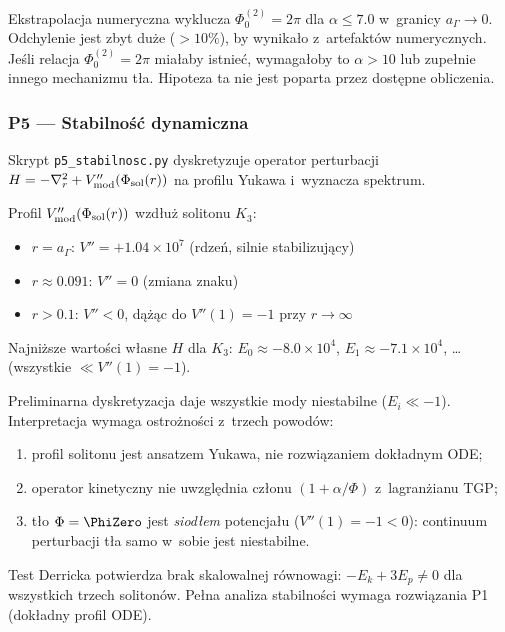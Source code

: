 \begin{result}%
\label{res:p4}
Ekstrapolacja numeryczna wyklucza $\Phi_0^{(2)} = 2\pi$ dla
$\alpha \leq 7.0$ w~granicy $a_\Gamma \to 0$.
Odchylenie jest zbyt duże ($>10\%$), by wynikało z~artefaktów numerycznych.
Jeśli relacja $\Phi_0^{(2)} = 2\pi$ miałaby istnieć,
wymagałoby to $\alpha > 10$ lub zupełnie innego mechanizmu tła.
Hipoteza ta nie jest poparta przez dostępne obliczenia.
\end{result}

\subsubsection*{P5 — Stabilność dynamiczna}

Skrypt \texttt{p5\_stabilnosc.py} dyskretyzuje operator perturbacji
$H = -\nabla^2_r + V''_{\rm mod}(\Phi_{\rm sol}(r))$
na profilu Yukawa i~wyznacza spektrum.

Profil $V''_{\rm mod}(\Phi_{\rm sol}(r))$ wzdłuż solitonu $K_3$:
\begin{itemize}[nosep]
\item $r = a_\Gamma$: $V'' = +1.04 \times 10^7$ (rdzeń, silnie stabilizujący)
\item $r \approx 0.091$: $V'' = 0$ (zmiana znaku)
\item $r > 0.1$: $V'' < 0$, dążąc do $V''(1) = -1$ przy $r \to \infty$
\end{itemize}

Najniższe wartości własne $H$ dla $K_3$:
$E_0 \approx -8.0 \times 10^4$, $E_1 \approx -7.1\times10^4$, \ldots
(wszystkie $\ll V''(1) = -1$).

\begin{result}%
\label{res:p5}
Preliminarna dyskretyzacja daje wszystkie mody niestabilne
($E_i \ll -1$). Interpretacja wymaga ostrożności z~trzech powodów:
\begin{enumerate}[nosep,label=(\roman*)]
\item profil solitonu jest ansatzem Yukawa, nie rozwiązaniem dokładnym ODE;
\item operator kinetyczny nie uwzględnia członu $(1 + \alpha/\Phi)$ z~lagranżianu TGP;
\item tło $\Phi = \PhiZero$ jest \emph{siodłem} potencjału ($V''(1) = -1 < 0$):
      continuum perturbacji tła samo w~sobie jest niestabilne.
\end{enumerate}
Test Derricka potwierdza brak skalowalnej równowagi:
$-E_k + 3E_p \neq 0$ dla wszystkich trzech solitonów.
Pełna analiza stabilności wymaga rozwiązania P1 (dokładny profil ODE).
\end{result}

